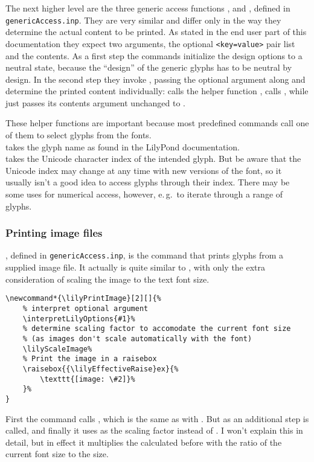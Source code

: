 \documentclass{article}
\begin{document}
\medskip
The next higher level are the three generic access functions ,  and , defined in \texttt{genericAccess.inp}.
They are very similar and differ only in the way they determine the actual content to be printed.
As stated in the end user part of this documentation they expect two arguments, the optional \texttt{<key=value>} pair list and the contents.
As a first step the commands initialize the design options to a neutral state, because the \enquote{design} of the generic glyphs has to be neutral by design.
In the second step they invoke , passing the optional argument along and determine the printed content individually:
 calls the helper function ,  calls , while  just passes its contents argument unchanged to .

\medskip
These helper functions are important because most predefined commands call one of them to select glyphs from the \emmentaler fonts.\\
 takes the glyph name as found in the LilyPond documentation.\\
 takes the Unicode character index of the intended glyph.
But be aware that the Unicode index may change at any time with new versions of the \emmentaler font, so it usually isn't a good idea to access glyphs through their index.
There may be some uses for numerical access, however, e.\,g.\ to iterate through a range of glyphs.

\subsubsection{Printing image files}
\label{subsubsec:printing_image_files}
, defined in \texttt{genericAccess.inp}, is the command that prints glyphs from a supplied image file.
It actually is quite similar to , with only the extra consideration of scaling the image to the text font size.

\begin{verbatim}
\newcommand*{\lilyPrintImage}[2][]{%
    % interpret optional argument
    \interpretLilyOptions{#1}%
    % determine scaling factor to accomodate the current font size 
    % (as images don't scale automatically with the font)
    \lilyScaleImage%
    % Print the image in a raisebox
    \raisebox{{\lilyEffectiveRaise}ex}{%
        \texttt{[image: \#2]}%
    }%
}
\end{verbatim}
First the command calls , which is the same as with .
But as an additional step  is called, and finally it uses  as the scaling factor instead of .
I won't explain this in detail, but in effect it multiplies the  calculated before with the ratio of the current font size to the  size.
\end{document}
